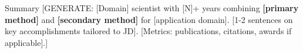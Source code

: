 \documentclass{resume}
\begin{document}
%
%
%
%

\vspace{-0.15cm}

\begin{rSection}{Summary}
[GENERATE: [Domain] scientist with [N]+ years combining \textbf{[primary method]} and \textbf{[secondary method]} for [application domain]. [1-2 sentences on key accomplishments tailored to JD]. [Metrics: publications, citations, awards if applicable].]
\end{rSection}
\vspace{-0.15cm}
\end{document}
